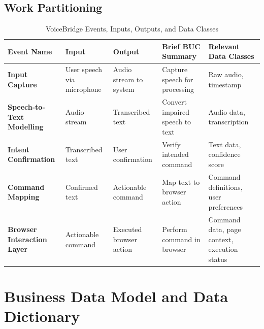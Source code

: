 \documentclass[11pt]{article}
\newcommand{\lips}{\textit{Insert your content here.}}
\begin{document}
\subsection{Work Partitioning}
\begin{table}[H]
\centering
\begin{tabularx}{\textwidth}{X X X X X}
\toprule
\textbf{Event Name} & \textbf{Input} & \textbf{Output} & \textbf{Brief BUC Summary} & \textbf{Relevant Data Classes} \\
\midrule
\textbf{Input Capture} & User speech via microphone & Audio stream to system & Capture speech for processing & Raw audio, timestamp \\
\hline
\textbf{Speech-to-Text Modelling} & Audio stream & Transcribed text & Convert impaired speech to text & Audio data, transcription \\
\hline
\textbf{Intent Confirmation} & Transcribed text & User confirmation & Verify intended command & Text data, confidence score \\
\hline
\textbf{Command Mapping} & Confirmed text & Actionable command & Map text to browser action & Command definitions, user preferences \\
\hline
\textbf{Browser Interaction Layer} & Actionable command & Executed browser action & Perform command in browser & Command data, page context, execution status \\
\bottomrule
\end{tabularx}
\caption{VoiceBridge Events, Inputs, Outputs, and Data Classes}
\label{tab:voicebridge-events}
\end{table}


\section{Business Data Model and Data Dictionary}
\end{document}
